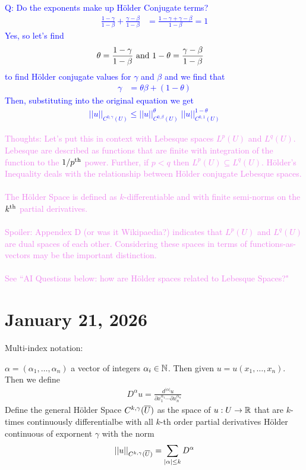 \documentclass[12pt,a4paper]{report}
\newcommand{\BLUE}[1]{\textcolor{blue}{#1}}
\newcommand{\VIOLET}[1]{\textcolor{violet}{#1}}
\newcommand{\HSPACE}[3]{C^{#1,#2}(#3)}
\newcommand{\HOLDERNORM}[4]{|| #4 ||_{\HSPACE{#1}{#2}{#3}}}
\begin{document}
\BLUE{Q: Do the exponents make up H\"older Conjugate terms?
\begin{align*}
	\frac{1-\gamma}{1-\beta} + \frac{\gamma-\beta}{1-\beta} &= \frac{1-\gamma+\gamma-\beta}{1-\beta} = 1 
\end{align*}Yes, so let's find 
\begin{align*}
	\theta &= \frac{1-\gamma}{1-\beta} \text{ and } 1-\theta = \frac{\gamma-\beta}{1-\beta} 	
\end{align*}to find H\"older conjugate values for $\gamma$ and $\beta$ and we find that
\begin{align*}
	\gamma &= \theta\beta +(1-\theta)
\end{align*}Then, substituting into the original equation we get
\begin{align*}
	\HOLDERNORM{0}{\gamma}{U}{u} \le \HOLDERNORM{0}{\beta}{U}{u}^{\theta}\;\HOLDERNORM{0}{1}{U}{u}^{1-\theta}
\end{align*}
}

\VIOLET{Thoughts: Let's put this in context with Lebesque spaces $L^p(U)$ and $L^q(U)$. Lebesque are described as functions that are finite with integration of the function to the $1/p\textsuperscript{th}$ power.  Further, if $p<q$ then $L^p(U) \subseteq L^q(U)$. H\"older's Inequality deals with the relationship between H\"older conjugate Lebesque spaces.\\
\\The H\"older Space  is defined as $k$-differentiable and with finite semi-norms on the $k\textsuperscript{th}$ partial derivatives.\\
\\Spoiler: Appendex D (or was it Wikipaedia?) indicates that $L^p(U)$ and $L^q(U)$ are dual spaces of each other.  Considering these spaces in terms of functions-as-vectors may be the important distinction.\\
\\See ``AI Questions below: how are H\"older spaces related to Lebesque Spaces?"
}

\HLINE
\section*{January 21, 2026}

Multi-index notation:

$\alpha = (\alpha_1,\dots, \alpha_n)$ a vector of integers $\alpha_i \in \mathbb{N}$.  Then given $u=u(x_1,\dots, x_n)$.  Then we define
\begin{align*}
	D^\alpha u = \frac{d^{|\alpha|}u}{\partial x_1^{\alpha_1}\cdots\partial x_n^{\alpha_n}}
\end{align*}
Define the general H\"older Space $\HSPACE{k}{\gamma}{\CONJ{U}}$ as the space of $u:U \to \mathbb{R}$ that are $k$-times continuously differentialbe with all $k$-th order partial derivatives H\"older continuous of expornent $\gamma$ with the norm 
\begin{align*}
	\HOLDERNORM{k}{\gamma}{\CONJ{U}}{u} = \sum_{|\alpha| \le k} D^\alpha
\end{align*}
\end{document}

